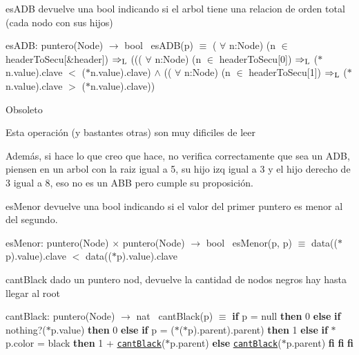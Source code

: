 \begin{DoxyParagraph}{es\+A\+DB}
devuelve una bool indicando si el arbol tiene una relacion de orden total (cada nodo con sus hijos)

es\+A\+DB\+: puntero(\+Node) $\to$ bool~\newline
 es\+A\+D\+B(p) $\equiv$ ( $\forall$ n\+:Node) (n $\in$ header\+To\+Secu\mbox{[}\&header\mbox{]}) $\Rightarrow_{\rm L}$ ((( $\forall$ n\textquotesingle{}\+:Node) (n\textquotesingle{} $\in$ header\+To\+Secu\mbox{[}0\mbox{]}) $\Rightarrow_{\rm L}$ ($\ast$n\textquotesingle{}.value).clave $<$ ($\ast$n.value).clave) $\land$ (( $\forall$ n\textquotesingle{}\textquotesingle{}\+:Node) (n\textquotesingle{}\textquotesingle{} $\in$ header\+To\+Secu\mbox{[}1\mbox{]}) $\Rightarrow_{\rm L}$ ($\ast$n\textquotesingle{}\textquotesingle{}.value).clave $>$ ($\ast$n.value).clave)) 
\end{DoxyParagraph}


\begin{DoxyRefDesc}{Obsoleto}
\item[\hyperlink{deprecated__deprecated000001}{Obsoleto}]Esta operación (y bastantes otras) son muy dificiles de leer 

Además, si hace lo que creo que hace, no verifica correctamente que sea un A\+DB, piensen en un arbol con la raiz igual a 5, su hijo izq igual a 3 y el hijo derecho de 3 igual a 8, eso no es un A\+BB pero cumple su proposición.\end{DoxyRefDesc}


\begin{DoxyParagraph}{es\+Menor}
devuelve una bool indicando si el valor del primer puntero es menor al del segundo.

es\+Menor\+: puntero(\+Node) $\times$ puntero(\+Node) $\to$ bool~\newline
 es\+Menor(p, p\textquotesingle{}) $\equiv$ data(($\ast$p).value).clave $<$ data(($\ast$p).value).clave 
\end{DoxyParagraph}


\begin{DoxyParagraph}{cant\+Black}
dado un puntero nod, devuelve la cantidad de nodos negros hay hasta llegar al root

cant\+Black\+: puntero(\+Node) $\to$ nat~\newline
 cant\+Black(p) $\equiv$ {\bfseries if} p = null {\bfseries then} 0 {\bfseries else} {\bfseries if} nothing?($\ast$p.value) {\bfseries then} 0 {\bfseries else} {\bfseries if} p = ($\ast$($\ast$p).parent).parent) {\bfseries then} 1 {\bfseries else} {\bfseries if} $\ast$p.color = black {\bfseries then} 1 + \href{axiomas.html#cantBlack}{\tt cant\+Black}($\ast$p.parent) {\bfseries else} \href{axiomas.html#cantBlack}{\tt cant\+Black}($\ast$p.parent) {\bfseries fi} {\bfseries fi} {\bfseries fi} 
\end{DoxyParagraph}


